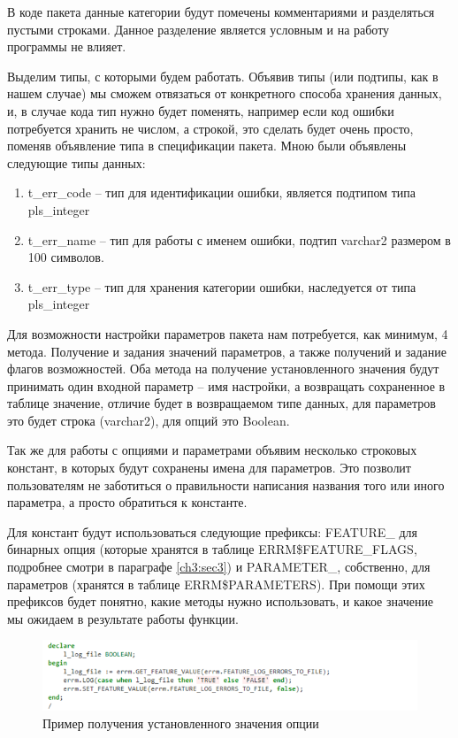 В коде пакета данные категории будут помечены комментариями и разделяться пустыми строками. Данное разделение является условным и на работу программы не влияет. 

Выделим типы, с которыми будем работать. Объявив типы (или подтипы, как в нашем случае) мы сможем отвязаться от конкретного способа хранения данных, и, в случае кода тип нужно будет поменять, например если код ошибки потребуется хранить не числом, а строкой, это сделать будет очень просто, поменяв объявление типа в спецификации пакета. Мною были объявлены следующие типы данных:

\begin{enumerate} 
\item t\_err\_code – тип для идентификации ошибки, является подтипом типа pls\_integer 
\item t\_err\_name – тип для работы с именем ошибки, подтип varchar2 размером в 100 символов.
\item t\_err\_type – тип для хранения категории ошибки, наследуется от типа pls\_integer
\end{enumerate} 

Для возможности настройки параметров пакета нам потребуется, как минимум, 4 метода. Получение и задания значений параметров, а также получений и задание флагов возможностей. Оба метода на получение установленного значения будут принимать один входной параметр – имя настройки, а возвращать сохраненное в таблице значение, отличие будет в возвращаемом типе данных, для параметров это будет строка (varchar2), для опций это Boolean. 

Так же для работы с опциями и параметрами объявим несколько строковых констант, в которых будут сохранены имена для параметров. Это позволит пользователям не заботиться о правильности написания названия того или иного параметра, а просто обратиться к константе. 

Для констант будут использоваться следующие префиксы: FEATURE\_ для бинарных опция (которые хранятся в таблице ERRM\$FEATURE\_FLAGS, подробнее смотри в параграфе \ref{ch3:sec3}) и PARAMETER\_, собственно, для параметров (хранятся в таблице ERRM\$PARAMETERS). При помощи этих префиксов будет понятно, какие методы нужно использовать, и какое значение мы ожидаем в результате работы функции. 

\begin{figure}[ht!] 
	\center
	\includegraphics [scale=1] {my_folder/img/C3_get_feature.png}
	\caption{Пример получения установленного значения опции} 
	\label{fig:C3_get_feature}  
\end{figure}
\FloatBarrier

